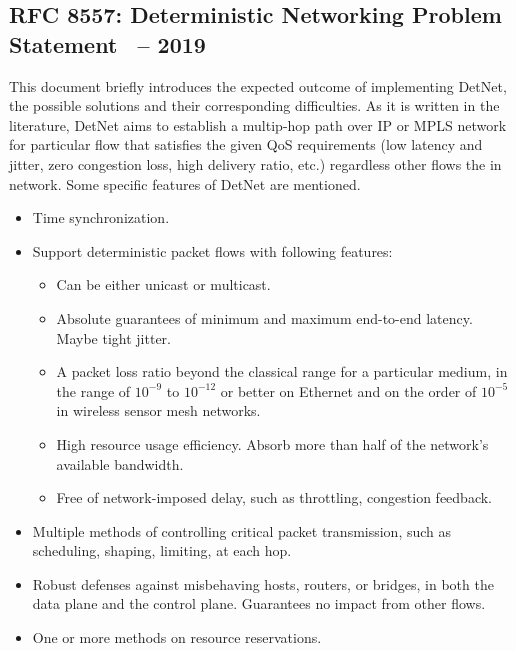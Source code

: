 \documentclass[12pt]{article}
\begin{document}
\subsection{RFC 8557: Deterministic Networking Problem Statement~\cite{finn2016deterministic} -- 2019}
This document briefly introduces the expected outcome of implementing DetNet, the possible solutions and their corresponding difficulties. As it is written in the literature, DetNet aims to establish a multip-hop path over IP or MPLS network for particular flow that satisfies the given QoS requirements (low latency and jitter, zero congestion loss, high delivery ratio, etc.) regardless other flows the in network.
Some specific features of DetNet are mentioned.
\begin{itemize}
    \item Time synchronization.
    \item Support deterministic packet flows with following features:
    \begin{itemize}
    \item Can be either unicast or multicast.
    \item Absolute guarantees of minimum and maximum end-to-end latency. Maybe tight jitter.
    \item A packet loss ratio beyond the classical range for a particular medium, in the range of $10^{-9}$ to $10^{-12}$ or better  on Ethernet and on the order of $10^{-5}$ in wireless sensor mesh networks.
    \item High resource usage efficiency. Absorb more than half of the network’s  available bandwidth.
    \item Free of network-imposed delay, such as throttling, congestion feedback.
\end{itemize}

    \item Multiple methods of controlling critical packet transmission, such as scheduling, shaping, limiting, at each hop.
    \item Robust defenses against misbehaving hosts, routers, or bridges, in both the data plane and the control plane. Guarantees no impact from other flows.
    \item One or more methods on resource reservations.
\end{itemize}
\end{document}

